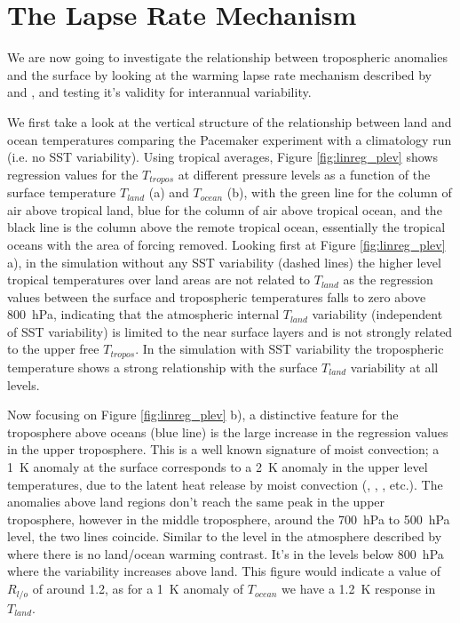 
\section{The Lapse Rate Mechanism}

We are now going to investigate the relationship between tropospheric anomalies 
and the surface by looking at the warming lapse rate mechanism described by 
\citet{Joshi2007} and \citet{Byrne2013a}, and testing it's validity for 
interannual variability. 

We first take a look at the vertical structure of the relationship between land 
and ocean temperatures comparing the Pacemaker experiment with a climatology run 
(i.e. no SST variability).  Using tropical averages, Figure 
\ref{fig:linreg_plev} shows regression values for the $T_{tropos}$ at different 
pressure levels as a function of the surface temperature $T_{land}$ (a) and 
$T_{ocean}$ (b), with the green line for the column of air above tropical land, 
blue for the column of air above tropical ocean, and the black line is the 
column above the remote tropical ocean, essentially the tropical oceans with the 
area of forcing removed.  Looking first at Figure \ref{fig:linreg_plev} a), in 
the simulation without any SST variability (dashed lines) the higher level 
tropical temperatures over land areas are not related to $T_{land}$ as the 
regression values between the surface and tropospheric temperatures falls to 
zero above \SI{800}{\hecto\pascal}, indicating that the atmospheric internal 
$T_{land}$ variability (independent of SST variability) is limited to the near 
surface layers and is not strongly related to the upper free $T_{tropos}$. In 
the simulation with SST variability the tropospheric temperature shows a strong 
relationship with the surface $T_{land}$ variability at all levels. 

Now focusing on Figure \ref{fig:linreg_plev} b), a distinctive feature for the 
troposphere above oceans (blue line) is the large increase in the regression 
values in the upper troposphere. This is a well known signature of moist
convection; a \SI{1}{\kelvin} anomaly at the surface corresponds to a 
\SI{2}{\kelvin} anomaly in the upper level temperatures, due to the latent heat 
release by moist convection (\citet{Joshi2007}, \citet{Byrne2013}, 
\citet{Dommenget2009}, etc.). The anomalies above land regions don't reach the 
same peak in the upper troposphere, however in the middle troposphere, around 
the \SI{700}{\hecto\pascal} to \SI{500}{\hecto\pascal} level, the two lines 
coincide. Similar to the level in the atmosphere described by \citet{Joshi2007} 
where there is no land/ocean warming contrast. It's in the levels below 
\SI{800}{\hecto\pascal} where the variability increases above land. This figure 
would indicate a value of $R_{l/o}$ of around 1.2, as for a \SI{1}{\kelvin} 
anomaly of $T_{ocean}$ we have a \SI{1.2}{\kelvin} response in $T_{land}$.  

